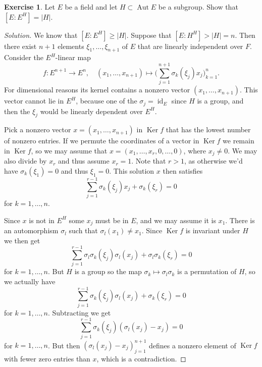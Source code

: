 \documentclass[11pt]{amsart}
\theoremstyle{definition}
\newtheorem{e}[theo]{Exercise}
\newenvironment{s}{\begin{proof}[Solution]}{\end{proof}}
\DeclareMathOperator{\id}{id}
\DeclareMathOperator{\Aut}{Aut}
\DeclareMathOperator{\Ker}{Ker}
\begin{document}
\begin{e}
Let $E$ be a field and let $H \subset \Aut E$ be a subgroup.
Show that $[E:E^H] = |H|$.
\end{e}

\begin{s}
We know that $[E:E^H] \geq |H|$.
Suppose that $[E:H^H] > |H| = n$.
Then there exist $n+1$ elements $\xi_1,\ldots,\xi_{n+1}$ of $E$ that are linearly independent over $F$.
Consider the $E^H$-linear map
\[
f : E^{n+1} \longrightarrow E^n,
\quad
(x_1, \ldots, x_{n+1}) 
\mapsto \biggl( \sum_{j=1}^{n+1} \sigma_k(\xi_j) x_j \biggr)_{k=1}^n.
\]
For dimensional reasons its kernel contains a nonzero vector $(x_1, \ldots, x_{n+1})$.
This vector cannot lie in $E^H$, because one of the $\sigma_j = \id_E$ since $H$ is a group, and then the $\xi_j$ would be linearly dependent over $E^H$.

Pick a nonzero vector $x = (x_1,\ldots,x_{n+1})$ in $\Ker f$ that has the lowest number of nonzero entries.
If we permute the coordinates of a vector in $\Ker f$ we remain in $\Ker f$, so we may assume that $x = (x_1, \ldots, x_r, 0, \ldots, 0)$, where $x_j \not= 0$.
We may also divide by $x_r$ and thus assume $x_r = 1$.
Note that $r > 1$, as otherwise we'd have $\sigma_k(\xi_1) = 0$ and thus $\xi_1 = 0$.
This solution $x$ then satisfies
\[
\sum_{j=1}^{r-1} \sigma_k(\xi_j) x_j + \sigma_k(\xi_r) = 0
\]
for $k = 1, \ldots, n$.

Since $x$ is not in $E^H$ some $x_j$ must be in $E$, and we may assume it is $x_1$.
There is an automorphism $\sigma_l$ such that $\sigma_l(x_1) \not= x_1$.
Since $\Ker f$ is invariant under $H$ we then get
\[
\sum_{j=1}^{r-1} \sigma_l \sigma_k(\xi_j) \sigma_l(x_j) + \sigma_l\sigma_k(\xi_r) = 0
\]
for $k = 1, \ldots, n$.
But $H$ is a group so the map $\sigma_k \mapsto \sigma_l\sigma_k$ is a permutation of $H$, so we actually have
\[
\sum_{j=1}^{r-1} \sigma_k(\xi_j) \sigma_l(x_j) + \sigma_k(\xi_r) = 0
\]
for $k = 1, \ldots, n$.
Subtracting we get
\[
\sum_{j=1}^{r-1} \sigma_k(\xi_j)(\sigma_l(x_j) - x_j) = 0
\]
for $k = 1, \ldots, n$.
But then $(\sigma_l(x_j) - x_j)_{j=1}^{n+1}$ defines a nonzero element of $\Ker f$ with fewer zero entries than $x$, which is a contradiction.
\end{s}
\end{document}
